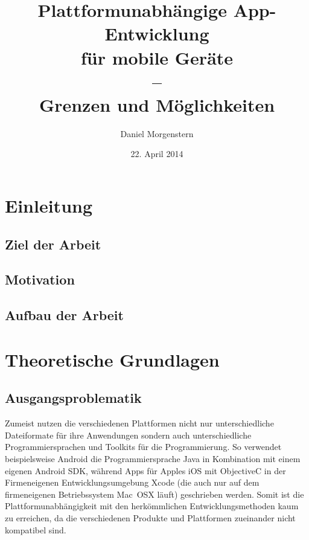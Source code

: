 \documentclass{scrreprt}
\title{Plattformunabhängige App-Entwicklung \\ für mobile Geräte \\--\\ Grenzen und Möglichkeiten}
\author{Daniel Morgenstern}
\date{22. April 2014}
\begin{document}
   \maketitle
   \tableofcontents
\chapter{Einleitung}
\section{Ziel der Arbeit}
\section{Motivation} %
\section{Aufbau der Arbeit} %
\chapter{Theoretische Grundlagen}

\section{Ausgangsproblematik}
Zumeist nutzen die verschiedenen Plattformen nicht nur unterschiedliche Dateiformate für ihre Anwendungen sondern auch unterschiedliche Programmiersprachen und Toolkits für die Programmierung. So verwendet beispielsweise Android die Programmiersprache Java in Kombination mit einem eigenen Android SDK, während Apps für Apples iOS mit ObjectiveC in der Firmeneigenen Entwicklungsumgebung Xcode (die auch nur auf dem firmeneigenen Betriebssystem Mac~OSX läuft) geschrieben werden. Somit ist die Plattformunabhängigkeit mit den herkömmlichen Entwicklungsmethoden kaum zu erreichen, da die verschiedenen Produkte und Plattformen zueinander nicht kompatibel sind.
\end{document}
